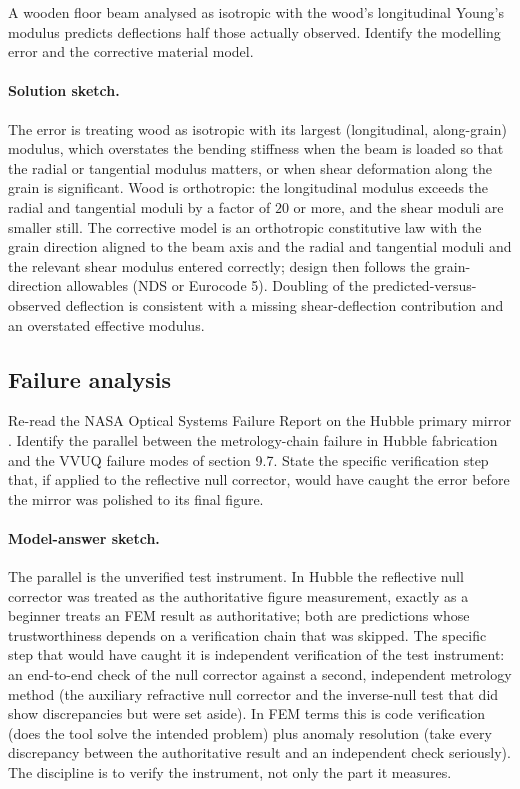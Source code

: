 \begin{exercise}
A wooden floor beam analysed as isotropic with the wood's
longitudinal Young's modulus predicts deflections half those
actually observed. Identify the modelling error and the
corrective material model.

\paragraph{Solution sketch.} The error is treating wood as isotropic
with its largest (longitudinal, along-grain) modulus, which overstates
the bending stiffness when the beam is loaded so that the radial or
tangential modulus matters, or when shear deformation along the grain
is significant. Wood is orthotropic: the longitudinal modulus exceeds
the radial and tangential moduli by a factor of $20$ or more, and the
shear moduli are smaller still. The corrective model is an orthotropic
constitutive law with the grain direction aligned to the beam axis and
the radial and tangential moduli and the relevant shear modulus
entered correctly; design then follows the grain-direction allowables
(NDS or Eurocode 5). Doubling of the predicted-versus-observed
deflection is consistent with a missing shear-deflection contribution
and an overstated effective modulus.
\end{exercise}

\subsection*{Failure analysis}

\begin{exercise}
Re-read the NASA Optical Systems Failure Report on the Hubble
primary mirror \cite{acc:nasa-hubble-optical-systems-1990}.
Identify the parallel between the metrology-chain failure in
Hubble fabrication and the VVUQ failure modes of section 9.7.
State the specific verification step that, if applied to the
reflective null corrector, would have caught the error before
the mirror was polished to its final figure.

\paragraph{Model-answer sketch.} The parallel is the unverified test
instrument. In Hubble the reflective null corrector was treated as the
authoritative figure measurement, exactly as a beginner treats an FEM
result as authoritative; both are predictions whose trustworthiness
depends on a verification chain that was skipped. The specific step
that would have caught it is independent verification of the test
instrument: an end-to-end check of the null corrector against a second,
independent metrology method (the auxiliary refractive null corrector
and the inverse-null test that did show discrepancies but were set
aside). In FEM terms this is code verification (does the tool solve the
intended problem) plus anomaly resolution (take every discrepancy
between the authoritative result and an independent check seriously).
The discipline is to verify the instrument, not only the part it
measures.
\end{exercise}

